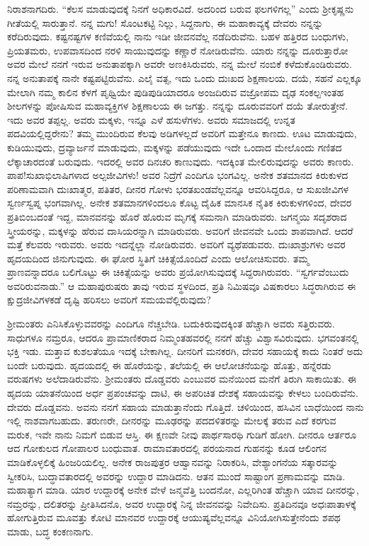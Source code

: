 ನಿರಾಶನಾಗದಿರು. “ಕೆಲಸ ಮಾಡುವುದಕ್ಕೆ ನಿನಗೆ ಅಧಿಕಾರವಿದೆ. ಅದರಿಂದ ಬರುವ ಫಲಗಳಿಗಲ್ಲ” ಎಂದು ಶ‍್ರೀಕೃಷ್ಣನು ಗೀತೆಯಲ್ಲಿ ಸಾರುತ್ತಾನೆ. ನನ್ನ ಮಗು! ಸೊಂಟಕಟ್ಟಿ ನಿಲ್ಲು, ಸಿದ್ದನಾಗು, ಈ ಮಹಾಕಾವ್ಯಕ್ಕೆ ದೇವರು ನನ್ನನ್ನು ಕರೆದಿರುವುದು. ಕಷ್ಟನಷ್ಟಗಳ ಕಣಿವೆಯಲ್ಲಿ ನಾನು ಇಡೀ ಜೀವನವೆಲ್ಲ ನಡೆದಿರುವೆನು. ಬಹಳ ಹತ್ತಿರದ ಬಂಧುಗಳು, ಪ್ರಿಯತಮರು, ಉಪವಾಸದಿಂದ ನರಳಿ ಸಾಯುವುದನ್ನು ಕಣ್ಣಾರೆ ನೋಡಿರುವೆನು. ಯಾರು ನನ್ನನ್ನು ದೂರುತ್ತಾರೋ ಅವರ ಮೇಲೆ ನನಗೆ ಇರುವ ಅನುತಾಪಕ್ಕಾಗಿ ಅವರೇ ಅಣಕಿಸಿರುವರು, ನನ್ನ ಮೇಲೆ ನಂಬಿಕೆ ಕಳೆದುಕೊಂಡಿರುವರು. ನನ್ನ ಅನುತಾಪಕ್ಕೆ ನಾನೇ ಕಷ್ಟಪಟ್ಟಿರುವೆನು. ಎಲೈ ವತ್ಸ, ಇದು ಒಂದು ದುಃಖದ ಶಿಕ್ಷಣಾಲಯ. ದಯೆ, ಸಹನೆ ಎಲ್ಲಕ್ಕೂ ಮೇಲಾಗಿ ನಮ್ಮ ಕಾಲಿನ ಕೆಳಗೆ ಪೃಥ್ವಿಯೇ ಪುಡಿಪುಡಿಯಾದರೂ ಅಂಜದಿರುವ ವಜ್ರೋಪಮ ದೃಢ ಸಂಕಲ್ಪ\enginline{-}ಇಂತಹ ಶೀಲಗಳನ್ನು ಪೋಷಿಸುವ ಮಹಾವ್ಯಕ್ತಿಗಳ ಶಿಕ್ಷಣಾಲಯ ಈ ಜಗತ್ತು. ನನ್ನನ್ನು ದೂರುವವರಿಗೆ ದಯೆ ತೋರುತ್ತೇನೆ. ಇದು ಅವರ ತಪ್ಪಲ್ಲ. ಅವರು ಮಕ್ಕಳು, ಇನ್ನೂ ಎಳೆ ಹಸುಳೆಗಳು. ಅವರು ಸಮಾಜದಲ್ಲಿ ಉನ್ನತ ಪದವಿಯಲ್ಲಿದ್ದರೇನು? ತಮ್ಮ ಮುಂದಿರುವ ಕೆಲವು ಅಡಿಗಳಲ್ಲದೆ ಅವರಿಗೆ ಮತ್ತೇನೂ ಕಾಣದು. ಊಟ ಮಾಡುವುದು, ಕುಡಿಯುವುದು, ದ್ರವ್ಯಾರ್ಜನೆ ಮಾಡುವುದು, ಮಕ್ಕಳನ್ನು ಪಡೆಯುವುದು ಇದೇ ಒಂದಾದ ಮೇಲೊಂದು ಗಣಿತದ ಲೆಕ್ಕಾಚಾರದಂತೆ ಬರುವುದು. ಇದರಲ್ಲಿ ಅವರ ದಿನಚರಿ ಕಾಣುವುದು. ಇದಕ್ಕಿಂತ ಮೇಲಿರುವುದನ್ನು ಅವರು ಕಾಣರು. ಪಾಪ!ಸುಖಾಭಿಲಾಷಿಗಳಾದ ಅಲ್ಪಜೀವಿಗಳು! ಅವರ ನಿದ್ರೆಗೆ ಎಂದಿಗೂ ಭಂಗವಿಲ್ಲ. ಅನೇಕ ಶತಮಾನದ ಕಿರುಕುಳದ ಪರಿಣಾಮವಾಗಿ ದುಃಖಾತ್ಮರ, ಪತಿತರ, ದೀನರ ಗೋಳು ಭರತಖಂಡವೆಲ್ಲವನ್ನೂ ಆವರಿಸಿದ್ದರೂ, ಆ ಸುಖಜೀವಿಗಳ ಸ್ವರ್ಣಸ್ವಪ್ನ ಭಂಗವಾಗಿಲ್ಲ. ಅನೇಕ ಶತಮಾನಗಳಿಂದಲೂ ಕೊಟ್ಟ ದೈಹಿಕ ಮಾನಸಿಕ ನೈತಿಕ ಕಿರುಕುಳಗಳಿಂದ, ದೇವರ ಪ್ರತಿಬಿಂಬದಂತೆ ಇದ್ದ, ಮಾನವನನ್ನು ಹೊರೆ ಹೊರುವ ಮೃಗಕ್ಕೆ ಸಮನಾಗಿ ಮಾಡಿರುವರು. ಜಗನ್ಮಯಿ ಸದೃಶರಾದ ಸ್ತ್ರೀಯರನ್ನು, ಮಕ್ಕಳನ್ನು ಹೆರುವ ದಾಸಿಯರನ್ನಾಗಿ ಮಾಡಿರುವರು. ಅವರಿಗೆ ಜೀವನವೇ ಒಂದು ಶಾಪವಾಗಿದೆ. ಆದರೆ ಮತ್ತೆ ಕೆಲವರು ಇರುವರು. ಅವರು ಇದನ್ನೆಲ್ಲಾ ನೋಡಿರುವರು. ಅವರಿಗೆ ವ್ಯಥೆಪಡುವರು. ದುಃಖಾಶ್ರುಗಳು ಅವರ ಹೃದಯದಿಂದ ಜಿನುಗುವುದು. ಈ ಘೋರ ಸ್ಥಿತಿಗೆ ಚಿಕಿತ್ಸೆಯೊಂದಿದೆ ಎಂದು ಆಲೋಚಿಸುವರು. ತಮ್ಮ ಪ್ರಾಣವನ್ನಾದರೂ ಬಲಿಗೊಟ್ಟು ಈ ಚಿಕಿತ್ಸೆಯನ್ನು ಅವರು ಪ್ರಯೋಗಿಸುವುದಕ್ಕೆ ಸಿದ್ದರಾಗಿರುವರು. “ಸ್ವರ್ಗವೆಂಬುದು ಅವರಿರುವನಾಡು.” ಆ ಮಹಾಪುರುಷರು ತಾವು ಇರುವ ಸ್ಥಳದಿಂದ, ಪ್ರತಿ ನಿಮಿಷವೂ ವಿಷಕಾರಲು ಸಿದ್ಧರಾಗಿರುವ ಈ ಕ್ಷುದ್ರಜೀವಿಗಳಕಡೆ ದೃಷ್ಟಿ ಹರಿಸಲು ಅವರಿಗೆ ಸಮಯವೆಲ್ಲಿರುವುದು?

ಶ‍್ರೀಮಂತರು ಎನಿಸಿಕೊಳ್ಳುವವರನ್ನು ಎಂದಿಗೂ ನೆಚ್ಚಬೇಡಿ. ಬದುಕಿರುವುದಕ್ಕಿಂತ ಹೆಚ್ಚಾಗಿ ಅವರು ಸತ್ತಿರುವರು. ಸಾಧುಗಳೂ ನಮ್ರರೂ, ಆದರೂ ಪ್ರಾಮಾಣಿಕರಾದ ನಿಮ್ಮಂತಹವರಲ್ಲಿ ನನಗೆ ಹೆಚ್ಚು ವಿಶ್ವಾಸವಿರುವುದು. ಭಗವಂತನಲ್ಲಿ ಭಕ್ತಿ ಇಡು. ಮತ್ತಾವ ಕುಶಲತೆಯೂ ಇದಕ್ಕೆ ಬೇಕಾಗಿಲ್ಲ. ದೀನರಿಗೆ ಮನಕರಗಿ, ದೇವರ ಸಹಾಯಕ್ಕೆ ಕಾದು ನಿಂತರೆ ಅದು ಬಂದೇ ಬರುವುದು. ಹೃದಯದಲ್ಲಿ ಈ ಹೊರೆಯನ್ನು, ತಲೆಯಲ್ಲಿ ಈ ಆಲೋಚನೆಯನ್ನು ಹೊತ್ತು, ಹನ್ನೆರಡು ವರುಷಗಳು ಅಲೆದಾಡಿರುವೆನು. ಶ‍್ರೀಮಂತರು ದೊಡ್ಡವರು ಎಂಬುವರ ಮನೆಯಿಂದ ಮನೆಗೆ ತಿರುಗಿ ಸಾಕಾಯಿತು. ಈ ಹೃದಯ ಯಾತನೆಯಿಂದ ಅರ್ಧ ಪ್ರಪಂಚವನ್ನು ದಾಟಿ, ಈ ಅಪರಿಚಿತ ದೇಶಕ್ಕೆ ಸಹಾಯವನ್ನು ಕೇಳಲು ಬಂದಿರುವೆನು. ದೇವರು ದೊಡ್ಡವನು. ಅವನು ನನಗೆ ಸಹಾಯ ಮಾಡುತ್ತಾನೆಂದು ಗೊತ್ತಿದೆ. ಚಳಿಯಿಂದ, ಹಸಿವಿನ ಬಾಧೆಯಿಂದ ನಾನು ಇಲ್ಲಿ ನಾಶವಾಗಬಹುದು. ತರುಣರೇ, ದೀನರನ್ನು ಮೂಢರನ್ನು ಪದದಳಿತರನ್ನು ಮೇಲಕ್ಕೆ ತರುವ ಎದೆ ಕರಗುವ ಮರುಕ, ಇವೇ ನಾನು ನಿಮಗೆ ಬಿಡುವ ಆಸ್ತಿ. ಈ ಕ್ಷಣವೇ ನೀವು ಪಾರ್ಥಸಾರಥಿ ಗುಡಿಗೆ ಹೋಗಿ. ದೀನರೂ ಆರ್ತರೂ ಆದ ಗೋಕುಲದ ಗೋಪಾಲರ ಬಂಧುವಾತ. ರಾಮಾವತಾರದಲ್ಲಿ ಪರಯನಾದ ಗುಹನನ್ನು ಕೂಡ ಆಲಿಂಗನ ಮಾಡಿಕೊಳ್ಳಲಿಕ್ಕೆ ಹಿಂಜರಿಯಲಿಲ್ಲ. ಅನೇಕ ರಾಜಪುತ್ರರ ಆಹ್ವಾನವನ್ನು ನಿರಾಕರಿಸಿ, ವೇಶ್ಯಾಂಗನೆಯ ಸತ್ಕಾರವನ್ನು ಸ್ವೀಕರಿಸಿ, ಬುದ್ಧಾವತಾರದಲ್ಲಿ ಅವರನ್ನು ಉದ್ದಾರ ಮಾಡಿದನು. ಆತನ ಮುಂದೆ ಸಾಷ್ಟಾಂಗ ಪ್ರಣಾಮವನ್ನು ಮಾಡಿ. ಮಹಾತ್ಯಾಗ ಮಾಡಿ. ಯಾರ ಉದ್ದಾರಕ್ಕೆ ಅನೇಕ ವೇಳೆ ಜನ್ಮವೆತ್ತಿ ಬಂದನೋ, ಎಲ್ಲರಿಗಿಂತ ಹೆಚ್ಚಾಗಿ ಯಾವ ದೀನರನ್ನು, ನಮ್ರರನ್ನು, ದಲಿತರನ್ನು ಪ್ರೀತಿಸಿದನೊ, ಅವರ ಉದ್ದಾರಕ್ಕೆ ನಿನ್ನ ಜೀವನವನ್ನು ನಿವೇದಿಸು. ಪ್ರತಿದಿನವೂ ಅಧಃಪಾತಾಳಕ್ಕೆ ಹೋಗುತ್ತಿರುವ ಮೂವತ್ತು ಕೋಟಿ ಮಾನವರ ಉದ್ದಾರಕ್ಕೆ ಆಯುಷ್ಯವೆಲ್ಲವನ್ನೂ ವಿನಿಯೋಗಿಸುತ್ತೇನೆಂದು ಶಪಥ ಮಾಡು, ಬದ್ಧ ಕಂಕಣನಾಗು.

